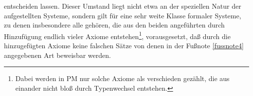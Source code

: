 \documentclass[draft]{scrartcl}
\newcounter{commentaryNumber}
\begin{document}
entscheiden lassen. Dieser Umstand liegt nicht etwa
an der speziellen Natur der aufgestellten Systeme,
sondern gilt für eine sehr weite Klasse formaler Systeme,
zu denen insbesondere alle gehören, die aus den beiden 
angeführten durch Hinzufügung endlich vieler Axiome
entstehen\footnote{Dabei werden in PM nur solche Axiome
als verschieden gezählt, die aus einander nicht bloß
durch Typenwechsel entstehen.}, vorausgesetzt, daß 
durch die hinzugefügten Axiome keine falschen Sätze 
von denen in der Fußnote \ref{fussnote4} angegebenen 
Art beweisbar werden.
\end{document}
